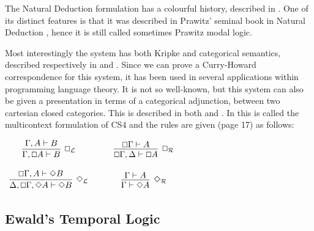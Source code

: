 \documentclass{article}
\renewcommand{\Box}{\oblong}
\begin{document}
The Natural Deduction formulation has a  colourful history, described in \cite{CS4}. One of its distinct features is that it was described in Prawitz' seminal book in Natural Deduction \cite{prawitz1965}, hence it is still called sometimes Prawitz modal logic.

Most interestingly the system has both Kripke and categorical semantics, described  respectively in \cite{alechinaetal} and \cite{CS4}. Since we can prove a Curry-Howard correspondence for this system, it has been used in several applications within programming language theory. 
It is not so well-known, but this system can also be given a presentation in terms of a categorical adjunction, between two cartesian closed categories. This is described in both \cite{CS4} and \cite{icalp1998}. In \cite{CS4} this is called the multicontext formulation of CS4 and the rules are given (page 17) as follows:

\begin{center}
  \begin{math}
    \begin{array}{ccccc}              
      \infer[\Box_{\mathcal{L}}]{\Gamma, \Box A \vdash B}{
        \Gamma,A \vdash B
      }
      & \quad &
      \infer[\Box_{\mathcal{R}}]{\Box\Gamma,\Delta \vdash \Box A}{
        \Box \Gamma \vdash A
      }\\\\
      \infer[\Diamond_{\mathcal{L}}]{\Delta,\Box\Gamma,\Diamond A \vdash \Diamond B}{
        \Box\Gamma,A \vdash \Diamond B
      }
      & \quad &
      \infer[\Diamond_{\mathcal{R}}]{\Gamma \vdash \Diamond A}{
        \Gamma \vdash A
      }
    \end{array}        
  \end{math}
\end{center}

\subsection{Ewald's Temporal Logic}
\end{document}
